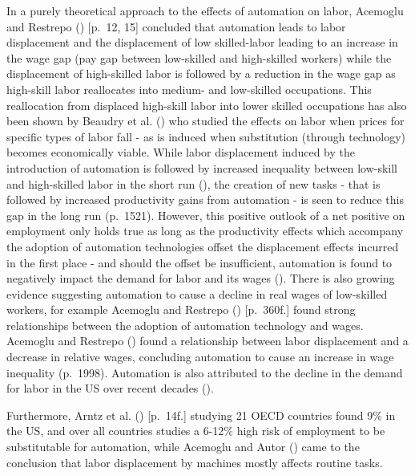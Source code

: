 \documentclass[
  11,
  a4paperpaper,
]{article}
\begin{document}
In a purely theoretical approach to the effects of automation on labor,
Acemoglu and Restrepo ()
{[}p.~12, 15{]} concluded that automation leads to labor displacement
and the displacement of low skilled-labor leading to an increase in the
wage gap (pay gap between low-skilled and high-skilled workers) while
the displacement of high-skilled labor is followed by a reduction in the
wage gap as high-skill labor reallocates into medium- and low-skilled
occupations. This reallocation from displaced high-skill labor into
lower skilled occupations has also been shown by Beaudry et al.
() who studied the effects
on labor when prices for specific types of labor fall - as is induced
when substitution (through technology) becomes economically viable.
While labor displacement induced by the introduction of automation is
followed by increased inequality between low-skill and high-skilled
labor in the short run (), the creation of new tasks - that is followed
by increased productivity gains from automation - is seen to reduce this
gap in the long run (p.~1521). However, this positive outlook of a net
positive on employment only holds true as long as the productivity
effects which accompany the adoption of automation technologies offset
the displacement effects incurred in the first place - and should the
offset be insufficient, automation is found to negatively impact the
demand for labor and its wages
(). There is also growing evidence suggesting automation to cause
a decline in real wages of low-skilled workers, for example Acemoglu and
Restrepo () {[}p.~360f.{]}
found strong relationships between the adoption of automation technology
and wages. Acemoglu and Restrepo
() found a relationship
between labor displacement and a decrease in relative wages, concluding
automation to cause an increase in wage inequality (p.~1998). Automation
is also attributed to the decline in the demand for labor in the US over
recent decades ().

Furthermore, Arntz et al. ()
{[}p.~14f.{]} studying 21 OECD countries found 9\% in the US, and over
all countries studies a 6-12\% high risk of employment to be
substitutable for automation, while Acemoglu and Autor
() came to the
conclusion that labor displacement by machines mostly affects routine
tasks.
\end{document}
